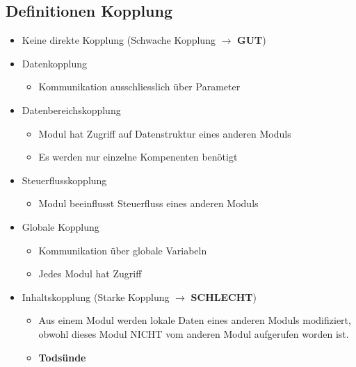 \begin{multicols}{2}
\subsection{Definitionen Kopplung}
\begin{itemize}
  \item Keine direkte Kopplung (Schwache Kopplung $\rightarrow$ \textbf{GUT})
  \item Datenkopplung
  \begin{itemize}
    \item Kommunikation ausschliesslich über Parameter 
  \end{itemize}
  \item Datenbereichskopplung
   \begin{itemize}
    \item Modul hat Zugriff auf Datenstruktur eines anderen Moduls
    \item Es werden nur einzelne Kompenenten benötigt
  \end{itemize}
  \item Steuerflusskopplung
  \begin{itemize}
    \item Modul beeinflusst Steuerfluss eines anderen Moduls
  \end{itemize}
  \item Globale Kopplung
  \begin{itemize}
    \item Kommunikation über globale Variabeln
    \item Jedes Modul hat Zugriff
  \end{itemize}
  \item Inhaltskopplung (Starke Kopplung $\rightarrow$ \textbf{SCHLECHT})
  \begin{itemize}
    \item Aus einem Modul werden lokale Daten eines anderen Moduls modifiziert,
    obwohl dieses Modul NICHT vom anderen Modul aufgerufen worden ist. 
    \item \textbf{Todsünde}
  \end{itemize}
\end{itemize}
\columnbreak

\end{multicols}
